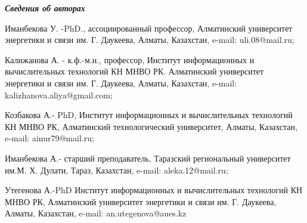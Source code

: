 \emph{{\bfseries Сведения об авторах}}

Иманбекова У. -PhD., ассоциированный профессор, Алматинский университет
энергетики и связи им. Г. Даукеева, Алматы, Казахстан, e-mail:
uli.08@mail.ru;

Калижанова А. - к.ф.-м.н., профессор, Институт информационных и
вычислительных технологий КН МНВО РК. Алматинский университет энергетики
и связи им. Г. Даукеева, Алматы, Казахстан, e-mail:
kalizhanova.aliya@gmail.com;

Козбакова А.- PhD, Институт информационных и вычислительных технологий
КН МНВО РК, Алматинский технологический университет, Алматы, Казахстан,
e-mail: ainur79@mail.ru;

Иманбекова А.- старший преподаватель, Таразский региональный университет
им.М. Х. Дулати, Тараз, Казахстан, e-mail: aleka.12@mail.ru;

Утегенова А.-PhD Институт информационных и вычислительных технологий КН
МНВО РК, Алматинский университет энергетики и связи им. Г. Даукеева,
Алматы, Казахстан, e-mail: an.utegenova@aues.kz
